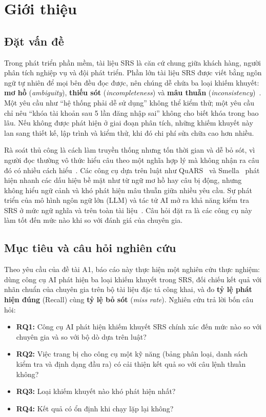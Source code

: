 \documentclass[12pt,a4paper]{report}
\begin{document}
\cleardoublepage
{}

\chapter{Giới thiệu}

\section{Đặt vấn đề}
Trong phát triển phần mềm, tài liệu SRS là căn cứ chung giữa khách hàng, người phân tích nghiệp vụ và đội phát triển. Phần lớn tài liệu SRS được viết bằng ngôn ngữ tự nhiên để mọi bên đều đọc được, nên chúng dễ chứa ba loại khiếm khuyết: \textbf{mơ hồ} (\textit{ambiguity}), \textbf{thiếu sót} (\textit{incompleteness}) và \textbf{mâu thuẫn} (\textit{inconsistency})~\cite{berry2003,iso29148}. Một yêu cầu như ``hệ thống phải dễ sử dụng'' không thể kiểm thử; một yêu cầu chỉ nêu ``khóa tài khoản sau 5 lần đăng nhập sai'' không cho biết khóa trong bao lâu. Nếu không được phát hiện ở giai đoạn phân tích, những khiếm khuyết này lan sang thiết kế, lập trình và kiểm thử, khi đó chi phí sửa chữa cao hơn nhiều.

Rà soát thủ công là cách làm truyền thống nhưng tốn thời gian và dễ bỏ sót, vì người đọc thường vô thức hiểu câu theo một nghĩa hợp lý mà không nhận ra câu đó có nhiều cách hiểu~\cite{berry2003}. Các công cụ dựa trên luật như QuARS~\cite{fabbrini2005} và Smella~\cite{femmer2017} phát hiện nhanh các dấu hiệu bề mặt như từ ngữ mơ hồ hay câu bị động, nhưng không hiểu ngữ cảnh và khó phát hiện mâu thuẫn giữa nhiều yêu cầu. Sự phát triển của mô hình ngôn ngữ lớn (LLM) và tác tử AI mở ra khả năng kiểm tra SRS ở mức ngữ nghĩa và trên toàn tài liệu~\cite{lubos2024,ronanki2025}. Câu hỏi đặt ra là các công cụ này làm tốt đến mức nào khi so với đánh giá của chuyên gia.

\section{Mục tiêu và câu hỏi nghiên cứu}
Theo yêu cầu của đề tài A1, báo cáo này thực hiện một nghiên cứu thực nghiệm: dùng công cụ AI phát hiện ba loại khiếm khuyết trong SRS, đối chiếu kết quả với nhãn chuẩn của chuyên gia trên bộ tài liệu đặc tả công khai, và đo \textbf{tỷ lệ phát hiện đúng} (Recall) cùng \textbf{tỷ lệ bỏ sót} (\textit{miss rate}). Nghiên cứu trả lời bốn câu hỏi:
\begin{itemize}
  \item \textbf{RQ1:} Công cụ AI phát hiện khiếm khuyết SRS chính xác đến mức nào so với chuyên gia và so với bộ dò dựa trên luật?
  \item \textbf{RQ2:} Việc trang bị cho công cụ một kỹ năng (bảng phân loại, danh sách kiểm tra và định dạng đầu ra) có cải thiện kết quả so với câu lệnh thuần không?
  \item \textbf{RQ3:} Loại khiếm khuyết nào khó phát hiện nhất?
  \item \textbf{RQ4:} Kết quả có ổn định khi chạy lặp lại không?
\end{itemize}
\end{document}
